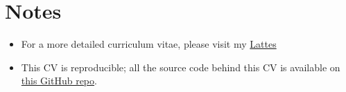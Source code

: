 \documentclass[11pt,a4paper,]{awesome-cv}
\providecommand{\tightlist}{%
	\setlength{\itemsep}{0pt}\setlength{\parskip}{0pt}}
\begin{document}
\hypertarget{notes}{%
\section{Notes}\label{notes}}

\begin{itemize}
\tightlist
\item
  For a more detailed curriculum vitae, please visit my
  \href{http://lattes.cnpq.br/8074214277248039}{Lattes}
\item
  This CV is reproducible; all the source code behind this CV is
  available on \href{https://github.com/csthiago/cv}{this GitHub repo}.
\end{itemize}
\end{document}
